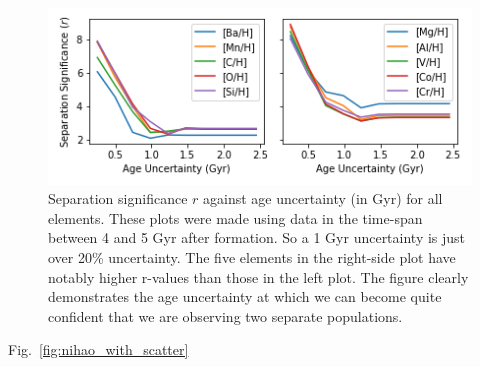 \documentclass[fleqn,usenatbib]{mnras}
\newcommand{\SB}[1]{{\textcolor{orange}{SB: #1}}}
\begin{document}

\begin{figure}
	\includegraphics[width=\columnwidth]{figures/same_axis_r_age.png}
    \caption{Separation significance $r$ against age uncertainty (in Gyr) for all elements. These plots were made using data in the time-span between 4 and 5 Gyr after formation. So a 1 Gyr uncertainty is just over 20\% uncertainty. The five elements in the right-side plot have notably higher r-values than those in the left plot. The figure clearly demonstrates the age uncertainty at which we can become quite confident that we are observing two separate populations.}
    \label{fig:r_v_age}
\end{figure}



Fig.~\ref{fig:nihao_with_scatter}
\end{document}
